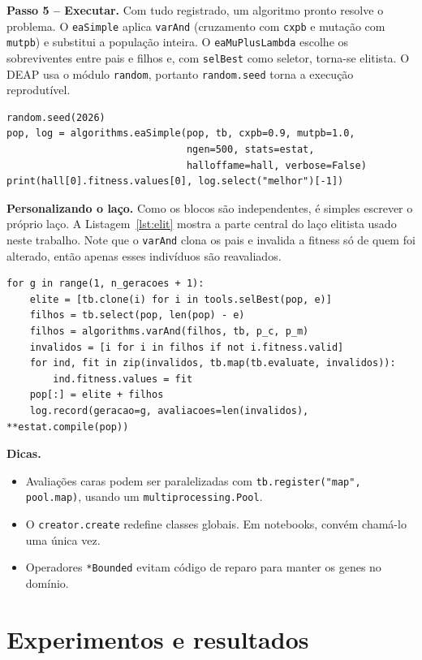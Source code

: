 \documentclass[conference]{IEEEtran}
\newcommand{\deap}{\textsc{DEAP}}
\newcommand{\code}[1]{\texttt{#1}}
\begin{document}
\textbf{Passo 5 -- Executar.} Com tudo registrado, um algoritmo pronto resolve o problema. O \code{eaSimple} aplica \code{varAnd} (cruzamento com \code{cxpb} e mutação com \code{mutpb}) e substitui a população inteira. O \code{eaMuPlusLambda} escolhe os sobreviventes entre pais e filhos e, com \code{selBest} como seletor, torna-se elitista. O \deap{} usa o módulo \code{random}, portanto \code{random.seed} torna a execução reprodutível.
\begin{lstlisting}
random.seed(2026)
pop, log = algorithms.eaSimple(pop, tb, cxpb=0.9, mutpb=1.0,
                               ngen=500, stats=estat,
                               halloffame=hall, verbose=False)
print(hall[0].fitness.values[0], log.select("melhor")[-1])
\end{lstlisting}

\textbf{Personalizando o laço.} Como os blocos são independentes, é simples escrever o próprio laço. A Listagem~\ref{lst:elit} mostra a parte central do laço elitista usado neste trabalho. Note que o \code{varAnd} clona os pais e invalida a fitness só de quem foi alterado, então apenas esses indivíduos são reavaliados.
\begin{lstlisting}[caption={Laço geracional com elitismo explícito.},label={lst:elit}]
for g in range(1, n_geracoes + 1):
    elite = [tb.clone(i) for i in tools.selBest(pop, e)]
    filhos = tb.select(pop, len(pop) - e)
    filhos = algorithms.varAnd(filhos, tb, p_c, p_m)
    invalidos = [i for i in filhos if not i.fitness.valid]
    for ind, fit in zip(invalidos, tb.map(tb.evaluate, invalidos)):
        ind.fitness.values = fit
    pop[:] = elite + filhos
    log.record(geracao=g, avaliacoes=len(invalidos), **estat.compile(pop))
\end{lstlisting}

\textbf{Dicas.}
\begin{itemize}
  \item Avaliações caras podem ser paralelizadas com \code{tb.register("map", pool.map)}, usando um \code{multiprocessing.Pool}.
  \item O \code{creator.create} redefine classes globais. Em notebooks, convém chamá-lo uma única vez.
  \item Operadores \code{*Bounded} evitam código de reparo para manter os genes no domínio.
\end{itemize}

\section{Experimentos e resultados}
\label{sec:res}
\end{document}
